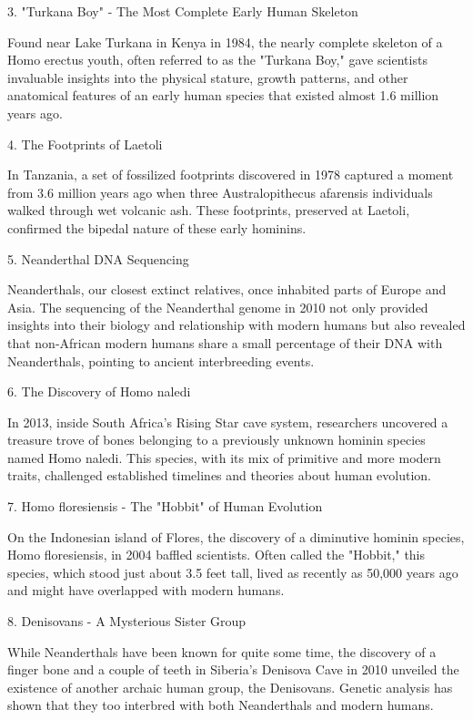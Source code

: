 \documentclass[a4paper,12pt]{book}
\begin{document}
3. "Turkana Boy" - The Most Complete Early Human Skeleton

Found near Lake Turkana in Kenya in 1984, the nearly complete skeleton of a Homo erectus youth, often referred to as the "Turkana Boy," gave scientists invaluable insights into the physical stature, growth patterns, and other anatomical features of an early human species that existed almost 1.6 million years ago.

4. The Footprints of Laetoli

In Tanzania, a set of fossilized footprints discovered in 1978 captured a moment from 3.6 million years ago when three Australopithecus afarensis individuals walked through wet volcanic ash. These footprints, preserved at Laetoli, confirmed the bipedal nature of these early hominins.

5. Neanderthal DNA Sequencing

Neanderthals, our closest extinct relatives, once inhabited parts of Europe and Asia. The sequencing of the Neanderthal genome in 2010 not only provided insights into their biology and relationship with modern humans but also revealed that non-African modern humans share a small percentage of their DNA with Neanderthals, pointing to ancient interbreeding events.

6. The Discovery of Homo naledi

In 2013, inside South Africa's Rising Star cave system, researchers uncovered a treasure trove of bones belonging to a previously unknown hominin species named Homo naledi. This species, with its mix of primitive and more modern traits, challenged established timelines and theories about human evolution.

7. Homo floresiensis - The "Hobbit" of Human Evolution

On the Indonesian island of Flores, the discovery of a diminutive hominin species, Homo floresiensis, in 2004 baffled scientists. Often called the "Hobbit," this species, which stood just about 3.5 feet tall, lived as recently as 50,000 years ago and might have overlapped with modern humans.

8. Denisovans - A Mysterious Sister Group

While Neanderthals have been known for quite some time, the discovery of a finger bone and a couple of teeth in Siberia's Denisova Cave in 2010 unveiled the existence of another archaic human group, the Denisovans. Genetic analysis has shown that they too interbred with both Neanderthals and modern humans.
\end{document}
